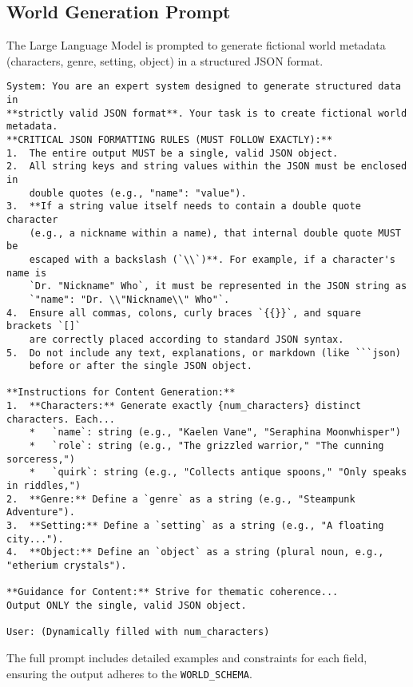 \documentclass{article}
\begin{document}
\subsection{World Generation Prompt}
\label{app:prompts_worldgen}
The Large Language Model is prompted to generate fictional world metadata (characters, genre, setting, object) in a structured JSON format.
\begin{verbatim}
System: You are an expert system designed to generate structured data in
**strictly valid JSON format**. Your task is to create fictional world metadata.
**CRITICAL JSON FORMATTING RULES (MUST FOLLOW EXACTLY):**
1.  The entire output MUST be a single, valid JSON object.
2.  All string keys and string values within the JSON must be enclosed in
    double quotes (e.g., "name": "value").
3.  **If a string value itself needs to contain a double quote character
    (e.g., a nickname within a name), that internal double quote MUST be
    escaped with a backslash (`\\`)**. For example, if a character's name is
    `Dr. "Nickname" Who`, it must be represented in the JSON string as
    `"name": "Dr. \\"Nickname\\" Who"`.
4.  Ensure all commas, colons, curly braces `{{}}`, and square brackets `[]`
    are correctly placed according to standard JSON syntax.
5.  Do not include any text, explanations, or markdown (like ```json)
    before or after the single JSON object.

**Instructions for Content Generation:**
1.  **Characters:** Generate exactly {num_characters} distinct characters. Each...
    *   `name`: string (e.g., "Kaelen Vane", "Seraphina Moonwhisper")
    *   `role`: string (e.g., "The grizzled warrior," "The cunning sorceress,")
    *   `quirk`: string (e.g., "Collects antique spoons," "Only speaks in riddles,")
2.  **Genre:** Define a `genre` as a string (e.g., "Steampunk Adventure").
3.  **Setting:** Define a `setting` as a string (e.g., "A floating city...").
4.  **Object:** Define an `object` as a string (plural noun, e.g., "etherium crystals").

**Guidance for Content:** Strive for thematic coherence...
Output ONLY the single, valid JSON object.

User: (Dynamically filled with num_characters)
\end{verbatim}
The full prompt includes detailed examples and constraints for each field, ensuring the output adheres to the \texttt{WORLD\_SCHEMA}.
\end{document}
